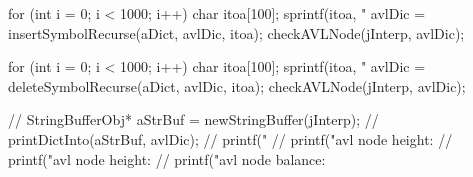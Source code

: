   for (int i = 0; i < 1000; i++) {
    char itoa[100];
    sprintf(itoa, "%
    avlDic = insertSymbolRecurse(aDict, avlDic, itoa);
  }
  checkAVLNode(jInterp, avlDic);

  for (int i = 0; i < 1000; i++) {
    char itoa[100];
    sprintf(itoa, "%
    avlDic = deleteSymbolRecurse(aDict, avlDic, itoa);
    checkAVLNode(jInterp, avlDic);
  }
  
//  StringBufferObj* aStrBuf = newStringBuffer(jInterp);
//  printDictInto(aStrBuf, avlDic);
//  printf("%
//  printf("avl node height: %
//  printf("avl node height: %
//  printf("avl node balance: %
\stopCTest
\stopTestCase
\stopTestSuite
